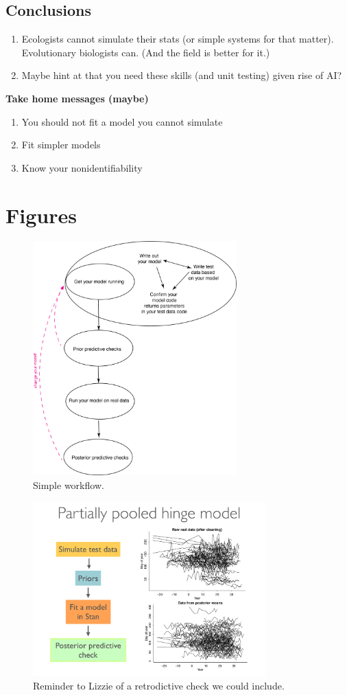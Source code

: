 \documentclass[11pt]{article}
\begin{document}
\subsection{Conclusions}
\begin{enumerate}
\item Ecologists cannot simulate their stats (or simple systems for that matter). Evolutionary biologists can. (And the field is better for it.)
\item Maybe hint at that you need these skills (and unit testing) given rise of AI?
\end{enumerate}

{\bf Take home messages (maybe)}
\begin{enumerate}
\item You should not fit a model you cannot simulate
\item Fit simpler models
\item Know your nonidentifiability
\end{enumerate}

\section{Figures}

\begin{figure}[ht]
\centering
\noindent \includegraphics[width=0.7\textwidth]{figures/workflow.png}
\caption{Simple workflow.}
\label{fig:workflow}
\end{figure}

\begin{figure}[ht]
\centering
\noindent \includegraphics[width=0.8\textwidth]{figures/Pages_from_generablestannyc.pdf}
\caption{Reminder to Lizzie of a retrodictive check we could include.}
\label{fig:retrodictivecheck}
\end{figure}
\end{document}

